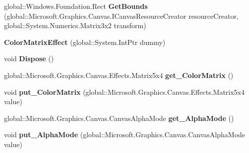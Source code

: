 \begin{DoxyCompactItemize}
global\+::\+Windows.\+Foundation.\+Rect {\bfseries Get\+Bounds} (global\+::\+Microsoft.\+Graphics.\+Canvas.\+I\+Canvas\+Resource\+Creator resource\+Creator, global\+::\+System.\+Numerics.\+Matrix3x2 transform)
\item 
\mbox{\label{class_microsoft_1_1_graphics_1_1_canvas_1_1_effects_1_1_color_matrix_effect_a0961cd0876bc2b7499a3e547f7418c29}} 
{\bfseries Color\+Matrix\+Effect} (global\+::\+System.\+Int\+Ptr dummy)
\item 
\mbox{\label{class_microsoft_1_1_graphics_1_1_canvas_1_1_effects_1_1_color_matrix_effect_ae0856b4a12befe77832ff39a67427820}} 
void {\bfseries Dispose} ()
\item 
\mbox{\label{class_microsoft_1_1_graphics_1_1_canvas_1_1_effects_1_1_color_matrix_effect_a74b7638815e4e2ee11e421a48b5a1a54}} 
global\+::\+Microsoft.\+Graphics.\+Canvas.\+Effects.\+Matrix5x4 {\bfseries get\+\_\+\+Color\+Matrix} ()
\item 
\mbox{\label{class_microsoft_1_1_graphics_1_1_canvas_1_1_effects_1_1_color_matrix_effect_a7d95e32f42f71f48b84cc81284f1023f}} 
void {\bfseries put\+\_\+\+Color\+Matrix} (global\+::\+Microsoft.\+Graphics.\+Canvas.\+Effects.\+Matrix5x4 value)
\item 
\mbox{\label{class_microsoft_1_1_graphics_1_1_canvas_1_1_effects_1_1_color_matrix_effect_abfdb6c68cffed7e33d14c5dac4b1ea80}} 
global\+::\+Microsoft.\+Graphics.\+Canvas.\+Canvas\+Alpha\+Mode {\bfseries get\+\_\+\+Alpha\+Mode} ()
\item 
\mbox{\label{class_microsoft_1_1_graphics_1_1_canvas_1_1_effects_1_1_color_matrix_effect_aecefb800adc320dde05a7b4b9ec65fe0}} 
void {\bfseries put\+\_\+\+Alpha\+Mode} (global\+::\+Microsoft.\+Graphics.\+Canvas.\+Canvas\+Alpha\+Mode value)
\item 
\mbox{\label{class_microsoft_1_1_graphics_1_1_canvas_1_1_effects_1_1_color_matrix_effect_a8f24f3336c23b20f9db23f8a09141338}} 

\end{DoxyCompactItemize}
